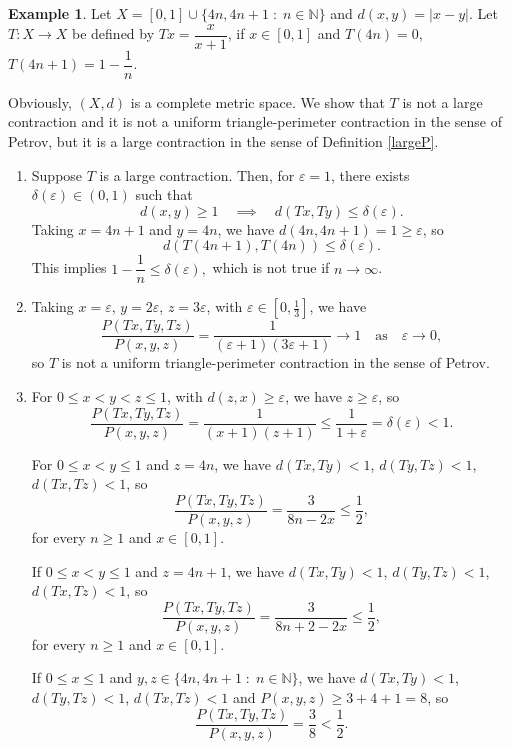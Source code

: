 \documentclass[12 pt]{article}
\theoremstyle{lema}
\theoremstyle{proposition}
\theoremstyle{theorem}
\theoremstyle{theorem}
\theoremstyle{corollary}
\theoremstyle{definition}
\theoremstyle{example}
\newtheorem{example}{Example}[section]
\def\n{\mathbb N}
\begin{document}
	\begin{example}
		Let \(X = [0,1] \cup \{ 4n, 4n+1\; : \;n \in \n \}\) and \(d(x,y)=|x-y|\). Let $T \colon X\to X$ be defined by \(Tx = \dfrac{x}{x+1}\), if \(x \in [0,1]\) and \(T(4n) = 0\), \(T(4n+1) = 1-\dfrac1n\). 
		
		Obviously, $(X,d)$ is a complete metric space. We show that \(T\) is not a large contraction and it is not a uniform triangle-perimeter contraction in the sense of Petrov, but it is a large contraction in the sense of Definition \ref{largeP}.
		
		\begin{enumerate}
			\item[1.] Suppose \(T\) is a large contraction. Then, for \(\varepsilon = 1\), there exists \(\delta(\varepsilon) \in (0,1)\) such that
			\[d(x,y) \geq 1 \quad \implies \quad d(Tx,Ty)\leq \delta(\varepsilon). \]
			Taking \(x=4n+1\) and \(y=4n\), we have \(d(4n,4n+1) = 1 \geq \varepsilon\), so \[d(T(4n+1),T(4n)) \leq \delta(\varepsilon). \] This implies \(1-\dfrac1n \leq \delta(\varepsilon), \) which is not true if \(n \to \infty\).
			
			\item[2.] Taking \(x=\varepsilon\), \(y=2\varepsilon\), \(z=3\varepsilon\), with \(\varepsilon \in [0,\frac13]\), we have
			\[ \dfrac{P(Tx, Ty, Tz)}{P(x, y, z)} = \dfrac{1}{(\varepsilon+1)(3\varepsilon+1)} \to 1 \quad \text{as}  \quad \varepsilon \to 0,\]
			so \(T\) is not a uniform triangle-perimeter contraction in the sense of Petrov.
			
			\item[3.] For \(0\leq x < y < z \leq 1\), with \(d(z,x) \geq \varepsilon\), we have \(z \geq \varepsilon\), so 
			\[ \dfrac{P(Tx, Ty, Tz)}{P(x, y, z)} = \dfrac{1}{(x+1)(z+1)} \leq \dfrac1{1+\varepsilon} = \delta(\varepsilon) < 1.\]
			
			For \(0\leq x < y \leq 1\) and \(z = 4n\), we have \(d(Tx,Ty) < 1\), \(d(Ty,Tz) < 1\), \(d(Tx,Tz) < 1\), so 
			\[ \dfrac{P(Tx, Ty, Tz)}{P(x, y, z)} = \dfrac{3}{8n-2x} \leq \dfrac12,\]
			for every \(n \geq 1\) and \(x \in [0,1]\).
			
			If \(0\leq x < y \leq 1\) and \(z = 4n+1\), we have \(d(Tx,Ty) < 1\), \(d(Ty,Tz) < 1\), \(d(Tx,Tz) < 1\), so 
			\[ \dfrac{P(Tx, Ty, Tz)}{P(x, y, z)} = \dfrac{3}{8n+2-2x} \leq \dfrac12,\]
			for every \(n \geq 1\) and \(x \in [0,1]\).
			
			If \(0\leq x \leq 1\) and \(y,z \in \{ 4n, 4n+1\; : \;n \in \n \} \), we have \(d(Tx,Ty) < 1\), \(d(Ty,Tz) < 1\), \(d(Tx,Tz) < 1\) and \(P(x, y, z) \geq 3+4+1 = 8\), so
			\[ \dfrac{P(Tx, Ty, Tz)}{P(x, y, z)} = \dfrac{3}{8} < \dfrac12.\]
			

\end{enumerate}
\end{example}
\end{document}
